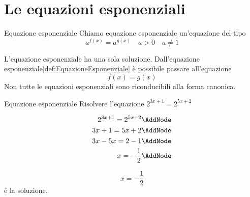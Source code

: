 \chapter{Le equazioni esponenziali}
\label{cha:LeEquazioniEsponenziali}
\begin{definizionet}{Equazione esponenziale}{}\label{def:EquazioneEsponenziale}
Chiamo equazione esponenziale un'equazione del tipo \[a^{f(x)}=a^{g(x)}\quad a>0\quad  a\neq1 \]
\end{definizionet}
L'equazione esponenziale ha una sola soluzione. 
Dall'equazione esponenziale\nobs\vref{def:EquazioneEsponenziale} è possibile passare all'equazione \[f(x)=g(x) \]Non tutte le equazioni esponenziali sono riconducibili alla forma canonica.
\begin{esempiot}{Equazione esponenziale}{}
	Risolvere l'equazione $2^{3x+1}=2^{5x+2} $
\end{esempiot}
\begin{NodesList}[margin=4cm]
\begin{align*}
2^{3x+1}=2^{5x+2}\AddNode\\
3x+1=5x+2\AddNode\\
3x-5x=2-1\AddNode\\
x=-\dfrac{1}{2}\AddNode
\end{align*}
%
%
%
\end{NodesList}
\[x=-\dfrac{1}{2}\]
\'{e} la soluzione.

